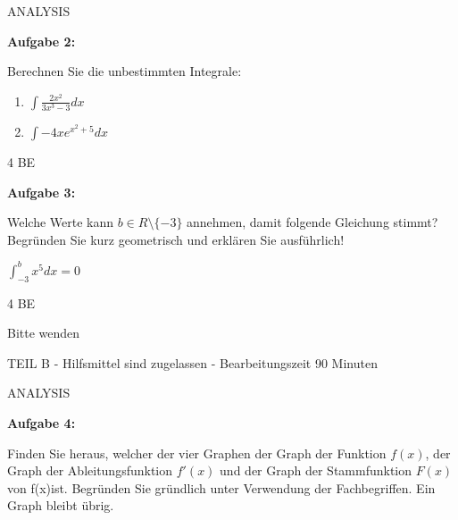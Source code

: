 \documentclass[a4paper,12pt]{article}
\newcommand{\Aufgabe}[1]{
  {
  \vspace*{0.5cm}
  \textsf{\textbf{Aufgabe #1}}
  \vspace*{0.2cm}
  
  }
}
\begin{document}
\vspace {0,5cm}
ANALYSIS

\Aufgabe{2:} 
Berechnen Sie die unbestimmten Integrale:

\begin{enumerate}[label={\alph*)}]
  \item $ \int \frac{2x^2}{3x^3-3} dx $
  \item $ \int -4xe^{x^2+5} dx $
\end{enumerate}
\begin{flushright}4 BE \end{flushright}
\Aufgabe{3:}
Welche Werte kann $ b \in R\setminus \{ -3\}$ annehmen, damit folgende Gleichung stimmt? Begründen Sie kurz geometrisch und erklären Sie ausführlich!

 $ \int_ {-3}^{b} x^5 dx =0$
\begin{flushright}4 BE \end{flushright}
\begin{flushright}Bitte wenden \end{flushright}
\newpage

\vspace{0,5cm} {TEIL B} -  Hilfsmittel sind zugelassen - Bearbeitungszeit 90 Minuten


\vspace {0,5cm}
ANALYSIS

\Aufgabe{4:}

Finden Sie heraus, welcher der vier Graphen der Graph der Funktion $f(x)$, der Graph der Ableitungsfunktion  $f'(x)$ und der Graph der Stammfunktion  $F(x)$ von f(x)ist. Begründen Sie gründlich unter Verwendung der Fachbegriffen. Ein Graph bleibt übrig.
\end{document}
